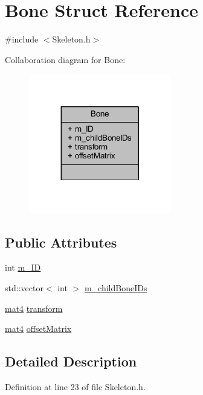\hypertarget{struct_bone}{}\section{Bone Struct Reference}
\label{struct_bone}


{\ttfamily \#include $<$Skeleton.\+h$>$}



Collaboration diagram for Bone\+:\nopagebreak
\begin{figure}[H]
\begin{center}
\leavevmode
\includegraphics[width=176pt]{struct_bone__coll__graph}
\end{center}
\end{figure}
\subsection*{Public Attributes}
\begin{DoxyCompactItemize}
\item 
int \hyperlink{struct_bone_ae27ac3ac39d8e707ba29f09a073564da}{m\+\_\+\+ID}
\item 
std\+::vector$<$ int $>$ \hyperlink{struct_bone_a00052ee6d532b058efa699b9b21e61f2}{m\+\_\+child\+Bone\+I\+Ds}
\item 
\hyperlink{_types_8h_a2db59f395fe82a7394c6324956c265d8}{mat4} \hyperlink{struct_bone_a24c5bc5cfeb022d82677b5f786d74ff2}{transform}
\item 
\hyperlink{_types_8h_a2db59f395fe82a7394c6324956c265d8}{mat4} \hyperlink{struct_bone_a842ad02b3b17a412a3fd505081c186db}{offset\+Matrix}
\end{DoxyCompactItemize}


\subsection{Detailed Description}


Definition at line 23 of file Skeleton.\+h.



